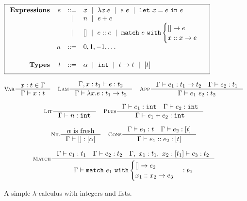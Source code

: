 \begin{figure}[t]
\centering
\[
\boxed{
\begin{array}{rrcl}
\mathbf{Expressions}
& e & ::=    & x \spmid \efun{x}{e} \spmid \eapp{e}{e} \spmid \elet{x}{e}{e} \\
&   & \spmid & n \spmid \eplus{e}{e}\\
&   & \spmid & \enil \spmid \econs{e}{e} \spmid \elcase{e}{e}{x}{x}{e} \\[0.05in]

& n & ::= &  0, 1, -1, \ldots \\[0.2in]

\mathbf{Types}
& t & ::= & \alpha \spmid %
            \tint \spmid \tarr{t}{t} \spmid %
            \tlist{t} \\[0.05in]
\end{array}
}
\]
\begin{framed}
\begin{gather*}
\inference[\textsc{Var}]
  {x:t \in \Gamma}
  {\jtype{\Gamma}{x}{t}}
\quad
\inference[\textsc{Lam}]
  {\jtype{\Gamma, x:t_1}{e}{t_2}}
  {\jtype{\Gamma}{\efun{x}{e}}{\tarr{t_1}{t_2}}}
\quad
\inference[\textsc{App}]
  {\jtype{\Gamma}{e_1}{\tarr{t_1}{t_2}}
   \quad
   \jtype{\Gamma}{e_2}{t_1}}
  {\jtype{\Gamma}{\eapp{e_1}{e_2}}{t_2}}
\\[0.1in]
\inference[\textsc{Lit}]
  {}
  {\jtype{\Gamma}{n}{\tint}}
\quad
\inference[\textsc{Plus}]
  {\jtype{\Gamma}{e_1}{\tint} \quad \jtype{\Gamma}{e_2}{\tint}}
  {\jtype{\Gamma}{\eplus{e_1}{e_2}}{\tint}}
\\[0.1in]
\inference[\textsc{Nil}]
  {\alpha \text{ is fresh}}
  {\jtype{\Gamma}{\enil}{\tlist{\alpha}}}
\quad
\inference[\textsc{Cons}]
  {\jtype{\Gamma}{e_1}{t} \quad \jtype{\Gamma}{e_2}{\tlist{t}}}
  {\jtype{\Gamma}{\econs{e_1}{e_2}}{\tlist{t}}}
\\[0.1in]
\inference[\textsc{Match}]
  {\jtype{\Gamma}{e_1}{t_1}
    \quad
   \jtype{\Gamma}{e_2}{t_2}
    \quad
   \jtype{\Gamma,\ x_1:t_1,\ x_2:\tlist{t_1}}{e_3}{t_2}
  }
  {\jtype{\Gamma}{\elcase{e_1}{e_2}{x_1}{x_2}{e_3}}{t_2}}
\end{gather*}
\end{framed}
\caption{A simple $\lambda$-calculus with integers and lists.}
\label{fig:intro:simple-lambda}
\end{figure}

